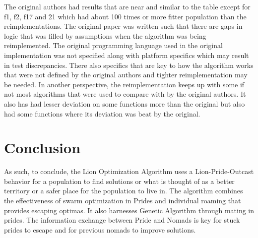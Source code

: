 \clearpage

The original authors had results that are near and similar to the table except for f1, f2, f17 and 21 which had about 100 times or more fitter population than the reimplementations. The original paper was written such that there are gaps in logic that was filled by assumptions when the algorithm was being reimplemented. The original programming language used in the original implementation was not specified along with platform specifics which may result in test discrepancies. There also specifics that are key to how the algorithm works that were not defined by the original authors and tighter reimplementation may be needed. In another perspective, the reimplementation keeps up with some if not most algorithms that were used to compare with by the original authors. It also has had lesser deviation on some functions more than the original but also had some functions where its deviation was beat by the original.

\section{Conclusion}

As such, to conclude, the Lion Optimization Algorithm uses a Lion-Pride-Outcast behavior for a population to find solutions or what is thought of as a better territory or a safer place for the population to live in. The algorithm combines the effectiveness of swarm optimization in Prides and individual roaming that provides escaping optimas. It also harnesses Genetic Algorithm through mating in prides. The information exchange between Pride and Nomads is key for stuck prides to escape and for previous nomads to improve solutions.
